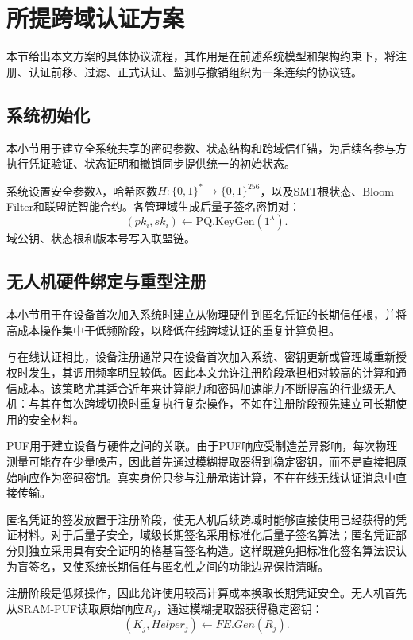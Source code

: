 \documentclass[conference]{IEEEtran}
\begin{document}
	\section{所提跨域认证方案}
	
	本节给出本文方案的具体协议流程，其作用是在前述系统模型和架构约束下，将注册、认证前移、过滤、正式认证、监测与撤销组织为一条连续的协议链。
	
	
	\subsection{系统初始化}
	
	本小节用于建立全系统共享的密码参数、状态结构和跨域信任锚，为后续各参与方执行凭证验证、状态证明和撤销同步提供统一的初始状态。
	
	系统设置安全参数$\lambda$，哈希函数$H:\{0,1\}^{*}\rightarrow\{0,1\}^{256}$，以及SMT根状态、Bloom Filter和联盟链智能合约。各管理域生成后量子签名密钥对：
	\begin{equation}
		(pk_i,sk_i)\leftarrow \mathrm{PQ.KeyGen}(1^\lambda).
	\end{equation}
	域公钥、状态根和版本号写入联盟链。
	
	\subsection{无人机硬件绑定与重型注册}
	
	本小节用于在设备首次加入系统时建立从物理硬件到匿名凭证的长期信任根，并将高成本操作集中于低频阶段，以降低在线跨域认证的重复计算负担。
	
	与在线认证相比，设备注册通常只在设备首次加入系统、密钥更新或管理域重新授权时发生，其调用频率明显较低。因此本文允许注册阶段承担相对较高的计算和通信成本。该策略尤其适合近年来计算能力和密码加速能力不断提高的行业级无人机：与其在每次跨域切换时重复执行复杂操作，不如在注册阶段预先建立可长期使用的安全材料。
	
	PUF用于建立设备与硬件之间的关联。由于PUF响应受制造差异影响，每次物理测量可能存在少量噪声，因此首先通过模糊提取器得到稳定密钥，而不是直接把原始响应作为密码密钥。真实身份只参与注册承诺计算，不在在线无线认证消息中直接传输。
	
	匿名凭证的签发放置于注册阶段，使无人机后续跨域时能够直接使用已经获得的凭证材料。对于后量子安全，域级长期签名采用标准化后量子签名算法；匿名凭证部分则独立采用具有安全证明的格基盲签名构造。这样既避免把标准化签名算法误认为盲签名，又使系统长期信任与匿名性之间的功能边界保持清晰。
	
	注册阶段是低频操作，因此允许使用较高计算成本换取长期凭证安全。无人机首先从SRAM-PUF读取原始响应$R_j$，通过模糊提取器获得稳定密钥：
	\begin{equation}
		(K_j,Helper_j)\leftarrow FE.Gen(R_j).
	\end{equation}
	
\end{document}

